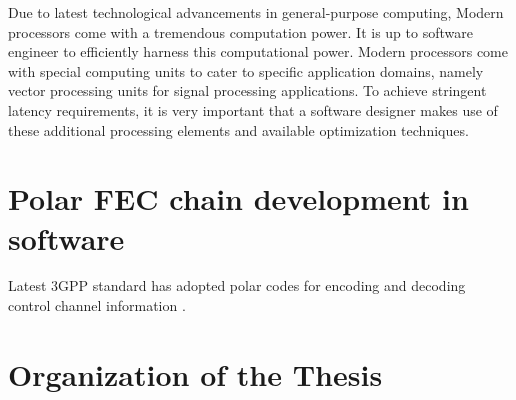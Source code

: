 Due to latest technological advancements in general-purpose computing, Modern processors come with a tremendous computation power. It is up to software engineer to efficiently harness this computational power. Modern processors come with special computing units to cater to specific application domains, namely vector processing units for signal processing applications. To achieve stringent latency requirements, it is very important that a software designer makes use of these additional processing elements and available optimization techniques.

%
%

\section{Polar FEC chain development in software}
Latest 3GPP standard has adopted polar codes for encoding and decoding control channel information \cite{3gpp.38.212}.



\section*{Organization of the Thesis}
